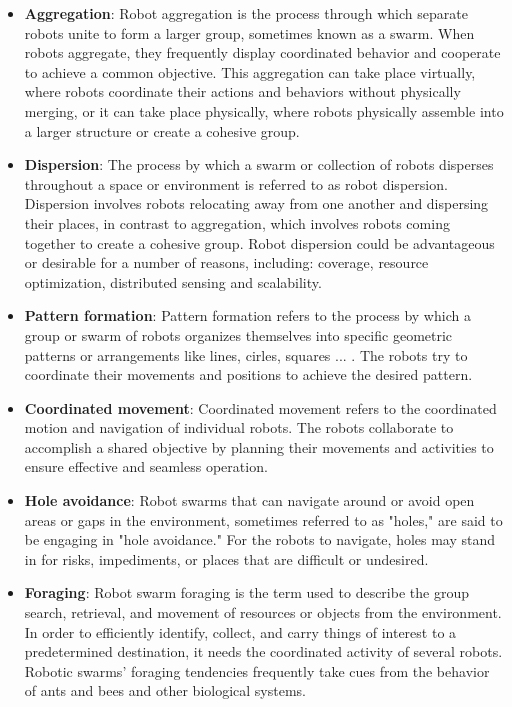 \documentclass[12pt]{extarticle}
\begin{document}
\begin{itemize} 

\item \textbf{Aggregation}: Robot aggregation is the process through which separate robots unite to form a larger group, sometimes known as a swarm. When robots aggregate, they frequently display coordinated behavior and cooperate to achieve a common objective. This aggregation can take place virtually, where robots coordinate their actions and behaviors without physically merging, or it can take place physically, where robots physically assemble into a larger structure or create a cohesive group.
\item \textbf{Dispersion}:
The process by which a swarm or collection of robots disperses throughout a space or environment is referred to as robot dispersion. Dispersion involves robots relocating away from one another and dispersing their places, in contrast to aggregation, which involves robots coming together to create a cohesive group. Robot dispersion could be advantageous or desirable for a number of reasons, including: coverage, resource optimization, distributed sensing and scalability.

\item \textbf{Pattern formation}: Pattern formation refers to the process by which a group or swarm of robots organizes themselves into specific geometric patterns or arrangements like lines, cirles, squares ... . The robots try to coordinate their movements and positions to achieve the desired pattern.
\item \textbf{Coordinated movement}:
Coordinated movement refers to the coordinated motion and navigation of individual robots. The robots collaborate to accomplish a shared objective by planning their movements and activities to ensure effective and seamless operation.

\item \textbf{Hole avoidance}:
Robot swarms that can navigate around or avoid open areas or gaps in the environment, sometimes referred to as "holes," are said to be engaging in "hole avoidance." For the robots to navigate, holes may stand in for risks, impediments, or places that are difficult or undesired. 
\item \textbf{Foraging}:
Robot swarm foraging is the term used to describe the group search, retrieval, and movement of resources or objects from the environment. In order to efficiently identify, collect, and carry things of interest to a predetermined destination, it needs the coordinated activity of several robots. Robotic swarms' foraging tendencies frequently take cues from the behavior of ants and bees and other biological systems.
\end{itemize}
\end{document}
